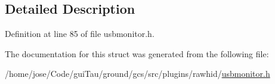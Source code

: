 \subsection{Detailed Description}


Definition at line 85 of file usbmonitor.\-h.



The documentation for this struct was generated from the following file\-:\begin{DoxyCompactItemize}
\item 
/home/jose/\-Code/gui\-Tau/ground/gcs/src/plugins/rawhid/\hyperlink{usbmonitor_8h}{usbmonitor.\-h}\end{DoxyCompactItemize}
